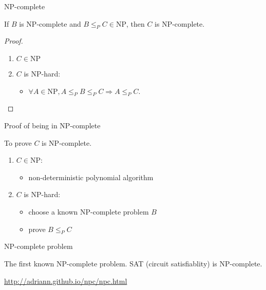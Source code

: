 \begin{frame}{NP-complete}
  \begin{theorem}
    If $B$ is NP-complete and $B \le_{P} C \in \text{NP}$, then $C$ is NP-complete.
  \end{theorem}
  
  \begin{proof}
    \begin{enumerate}
      \item $C \in \text{NP}$
      \item $C$ is NP-hard:
	\begin{itemize}
	  \item $\forall A \in \text{NP}, A \le_{P} B \le_{P} C \Rightarrow A \le_{P} C$.
	\end{itemize}
    \end{enumerate}
  \end{proof}
\end{frame}
\begin{frame}{Proof of being in NP-complete}
  \begin{exampleblock}{To prove $C$ is NP-complete.}
    \begin{enumerate}
      \item $C \in \text{NP}$:
	\begin{itemize}
	  \item non-deterministic polynomial algorithm
	\end{itemize}
      \item $C$ is NP-hard:
	\begin{itemize}
	  \item choose a known NP-complete problem $B$
	  \item prove $B \le_{P} C$
	\end{itemize}
    \end{enumerate}
  \end{exampleblock}
\end{frame}
\begin{frame}{NP-complete problem}
  \begin{exampleblock}{The first known NP-complete problem.}
    SAT (circuit satisfiablity) is NP-complete.
  \end{exampleblock}

\end{frame}
\begin{frame}

  \begin{center}
    \url{http://adriann.github.io/npc/npc.html}
  \end{center}
\end{frame}

